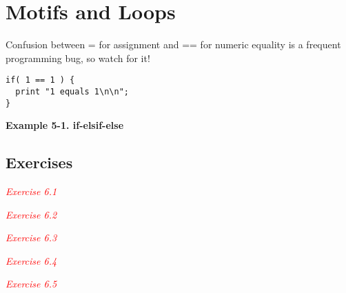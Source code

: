 \chapter{Motifs and Loops}
\label{chap:chapter5}
\minitoc




















\begin{adjustwidth}{2cm}{2cm}
  Confusion between = for assignment and == for numeric equality is a frequent programming bug, so watch for it! 
\end{adjustwidth}


\begin{lstlisting}
if( 1 == 1 ) {
  print "1 equals 1\n\n";
}
\end{lstlisting}


\textbf{Example 5-1. if-elsif-else}










\section{Exercises}
\textcolor{red}{\textit{Exercise 6.1}}
\begin{adjustwidth}{1cm}{}
\end{adjustwidth}

\textcolor{red}{\textit{Exercise 6.2}}
\begin{adjustwidth}{1cm}{}
\end{adjustwidth}

\textcolor{red}{\textit{Exercise 6.3}}
\begin{adjustwidth}{1cm}{}
\end{adjustwidth}

\textcolor{red}{\textit{Exercise 6.4}}
\begin{adjustwidth}{1cm}{}
\end{adjustwidth}

\textcolor{red}{\textit{Exercise 6.5}}
\begin{adjustwidth}{1cm}{}
\end{adjustwidth}

